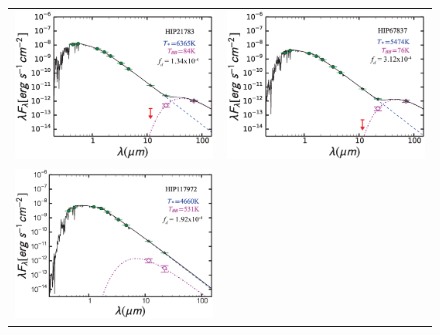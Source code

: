 \begin{figure}
\centering
\begin{tabular}{cc}
\includegraphics[scale=0.4]{Ch4/HIP21783} &
\includegraphics[scale=0.4]{Ch4/HIP67837} \\
\includegraphics[scale=0.4]{Ch4/HIP117972} &

\end{tabular}
\end{figure}
